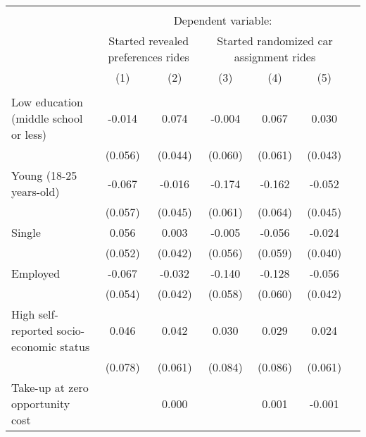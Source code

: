 \begin{tabular}{l*{6}{c}} \hline\hline \\[-1.8ex] & \multicolumn{5}{c}{Dependent variable:} \\[-1.8ex]
                    &\multicolumn{2}{p{3.2cm}}{\center Started revealed preferences rides}&\multicolumn{3}{p{5cm}}{\center Started randomized car assignment rides}\\\cmidrule(lr){2-3}\cmidrule(lr){4-6}
                    &\multicolumn{1}{c}{(1)}         &\multicolumn{1}{c}{(2)}         &\multicolumn{1}{c}{(3)}         &\multicolumn{1}{c}{(4)}         &\multicolumn{1}{c}{(5)}         \\
\hline \\[-1.8ex]
Low education (middle school or less)&      -0.014         &       0.074\sym{*}  &      -0.004         &       0.067         &       0.030         \\
                    &     (0.056)         &     (0.044)         &     (0.060)         &     (0.061)         &     (0.043)         \\
[1em]
Young (18-25 years-old)&      -0.067         &      -0.016         &      -0.174\sym{***}&      -0.162\sym{**} &      -0.052         \\
                    &     (0.057)         &     (0.045)         &     (0.061)         &     (0.064)         &     (0.045)         \\
[1em]
Single              &       0.056         &       0.003         &      -0.005         &      -0.056         &      -0.024         \\
                    &     (0.052)         &     (0.042)         &     (0.056)         &     (0.059)         &     (0.040)         \\
[1em]
Employed            &      -0.067         &      -0.032         &      -0.140\sym{**} &      -0.128\sym{**} &      -0.056         \\
                    &     (0.054)         &     (0.042)         &     (0.058)         &     (0.060)         &     (0.042)         \\
[1em]
High self-reported socio-economic status&       0.046         &       0.042         &       0.030         &       0.029         &       0.024         \\
                    &     (0.078)         &     (0.061)         &     (0.084)         &     (0.086)         &     (0.061)         \\
[1em]
Take-up at zero opportunity cost&                     &       0.000         &                     &       0.001         &      -0.001         \\

\end{tabular}
